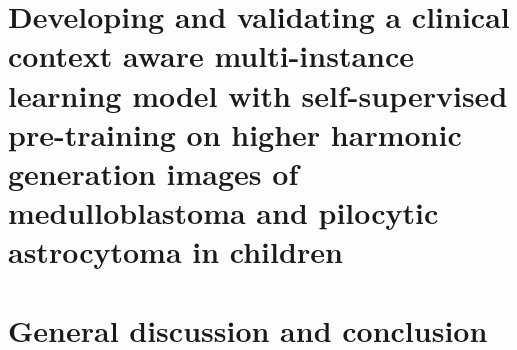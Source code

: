 \documentclass[
	fontsize=10pt, %
	twoside=false, %
	secnumdepth=2, %
	numbers=noenddot,
]{kaobook}
\begin{document}

\clearpage








\chapter[SCLICOM]{Developing and validating a clinical context aware multi-instance learning model with self-supervised pre-training on higher harmonic generation images of medulloblastoma and pilocytic astrocytoma in children}\label{ch:sclicom}



\clearpage








\chapter[General discussion and conclusion]{General discussion and conclusion}\label{ch:general_discussion_and_conclusion}



\printbibheading[title=References, heading=bibintoc]
\printbibliography[heading=none] %

\appendix %
\end{document}
